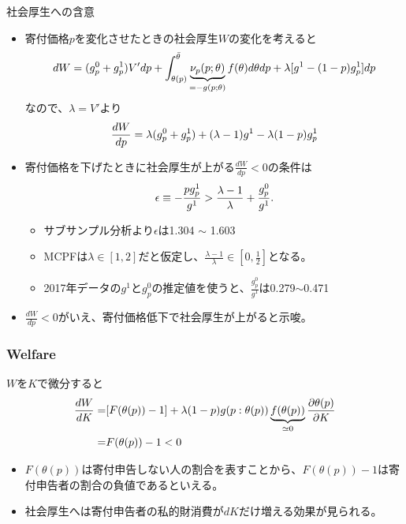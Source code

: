 \documentclass[dvipdfmx,10pt]{beamer}
\begin{document}
\begin{frame}{社会厚生への含意}
	\begin{itemize}
		\item 寄付価格$p$を変化させたときの社会厚生$W$の変化を考えると\begin{align}
			dW 
			=(g_p^0+g_p^1)V'dp+\int_{\theta(p)}^{\bar{\theta}}\underbrace{\nu_p(p;\theta)}_{=-g(p;\theta)}f(\theta)d\theta dp+\lambda[g^1-(1-p)g^1_p]dp\notag
		\end{align}
		なので、$\lambda=V'$より
		\begin{align}
			\frac{dW}{dp} =\lambda (g_p^0+g_p^1)+(\lambda-1)g^1-\lambda(1-p)g_p^1\notag
		\end{align}
		\item 寄付価格を下げたときに社会厚生が上がる$\frac{dW}{dp}<0$の条件は
		\begin{align}
			\epsilon\equiv -\frac{pg_p^1}{g^1}>\frac{\lambda-1}{\lambda}+\frac{g_p^0}{g^1}\notag.
		\end{align}
		\begin{itemize}
		\item サブサンプル分析より$\epsilon$は1.304 $\sim$ 1.603
		\item MCPFは$\lambda\in[1,2]$だと仮定し、$\frac{\lambda-1}{\lambda}\in[0,\frac12]$となる。
		\item 2017年データの$g^1$と$g_p^0$の推定値を使うと、$\frac{g_p^0}{g^1}$は0.279$\sim$0.471
		\end{itemize}
		\item $\frac{dW}{dp}<0$がいえ、寄付価格低下で社会厚生が上がると示唆。
	\end{itemize}
\end{frame}

\begin{frame}
	\frametitle{Welfare}
	$W$を$K$で微分すると
	\begin{align}
		\frac{dW}{dK}=&[F(\theta(p))-1]+\lambda(1-p)g(p:\theta(p))\underbrace{f(\theta(p))}_{\simeq0}\frac{\partial \theta(p)}{\partial K}\notag\\
		=&F(\theta(p))-1<0\notag
	\end{align}
\begin{itemize}
	\item $F(\theta(p))$は寄付申告しない人の割合を表すことから、$F(\theta(p))-1$は寄付申告者の割合の負値であるといえる。
	\item 社会厚生へは寄付申告者の私的財消費が$dK$だけ増える効果が見られる。
\end{itemize}
\end{frame}
\end{document}
